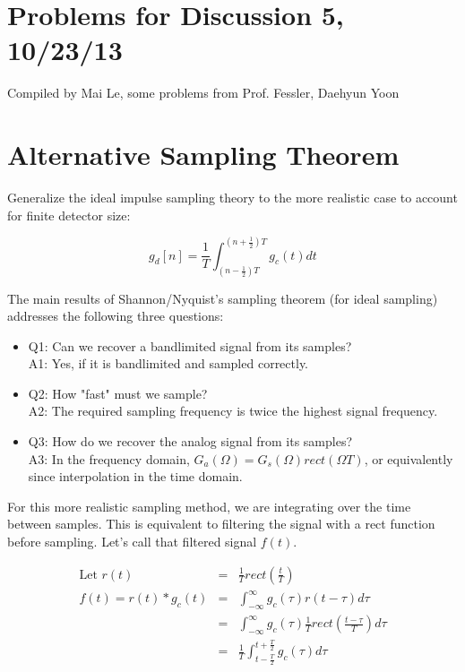 \documentclass[11pt]{article}
\begin{document}
{\small
\section*{Problems for Discussion 5, 10/23/13}
Compiled by Mai Le, some problems from Prof. Fessler, Daehyun Yoon
}

\section{Alternative Sampling Theorem}

Generalize the ideal impulse sampling theory to the more realistic case to account for finite detector size:

\[
g_d[n] = \frac{1}{T}\int_{(n-\frac{1}{2})T}^{(n+\frac{1}{2})T} g_c(t) dt
\]

{\color{blue}
The main results of Shannon/Nyquist's sampling theorem (for ideal sampling) addresses the following three questions:
\begin{itemize}
	\item Q1: Can we recover a bandlimited signal from its samples? \\
	\quad A1: Yes, if it is bandlimited and sampled correctly.
	\item Q2: How "fast" must we sample? \\
	\quad A2: The required sampling frequency is twice the highest signal frequency.
	\item Q3: How do we recover the analog signal from its samples? \\
	\quad A3: In the frequency domain, $G_a(\Omega) = G_s(\Omega) rect(\Omega T)$, or equivalently since interpolation in the time domain.
\end{itemize}

For this more realistic sampling method, we are integrating over the time between samples. This is equivalent to filtering the signal with a rect function before sampling. Let's call that filtered signal $f(t)$. 

\begin{eqnarray*}
\text{Let } r(t) &=& \frac{1}{T} rect\left(\frac{t}{T}\right) \\
f(t) = r(t) * g_c(t) &=& \int_{-\infty}^\infty g_c(\tau) r(t-\tau) d\tau \\
&=& \int_{-\infty}^\infty g_c(\tau) \frac{1}{T} rect\left(\frac{t-\tau}{T}\right) d\tau \\
&=& \frac{1}{T}  \int_{t-\frac{T}{2}}^{t+\frac{T}{2}} g_c(\tau) d\tau \\
\end{eqnarray*}

}
\end{document}
